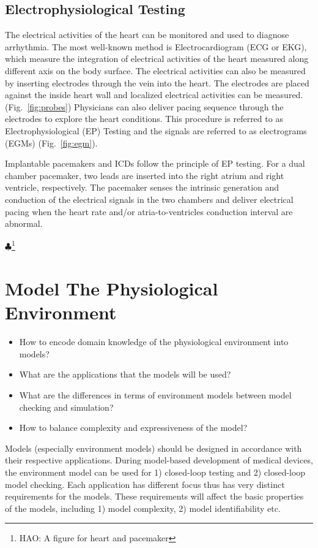 \documentclass[openany]{now} %
\newcommand{\figref}[1]{Fig.~\ref{fig:#1}}
\newcommand{\Hao}[1]{$\clubsuit$\footnote{HAO: #1}}
\begin{document}
\section{Electrophysiological Testing}
The electrical activities of the heart can be monitored and used to diagnose arrhythmia. The most well-known method is Electrocardiogram (ECG or EKG), which measure the integration of electrical activities of the heart measured along different axis on the body surface. The electrical activities can also be measured by inserting electrodes through the vein into the heart. The electrodes are placed against the inside heart wall and localized electrical activities can be measured. (\figref{probes}) Physicians can also deliver pacing sequence through the electrodes to explore the heart conditions. This procedure is referred to as Electrophysiological (EP) Testing and the signals are referred to as electrograms (EGMs) (\figref{egm}). 

Implantable pacemakers and ICDs follow the principle of EP testing. For a dual chamber pacemaker, two leads are inserted into the right atrium and right ventricle, respectively. The pacemaker senses the intrinsic generation and conduction of the electrical signals in the two chambers and deliver electrical pacing when the heart rate and/or atria-to-ventricles conduction interval are abnormal.

\Hao{A figure for heart and pacemaker}

\chapter{Model The Physiological Environment}
\begin{itemize}
	\item How to encode domain knowledge of the physiological environment into models?
    \item What are the applications that the models will be used?
    \item What are the differences in terms of environment models between model checking and simulation?
    \item How to balance complexity and expressiveness of the model?
\end{itemize}
Models (especially environment models) should be designed in accordance with their respective applications. During model-based development of medical devices, the environment model can be used for 1) closed-loop testing and 2) closed-loop model checking. Each application has different focus thus has very distinct requirements for the models. These requirements will affect the basic properties of the models, including 1) model complexity, 2) model identifiability etc. 
\end{document}
